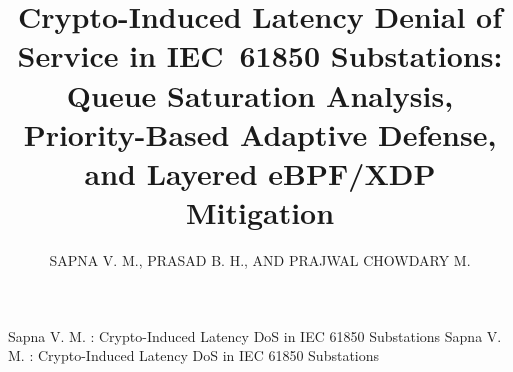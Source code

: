 \documentclass{ieeeaccess}
\begin{document}

\title{Crypto-Induced Latency Denial of Service in IEC~61850 Substations: Queue Saturation Analysis, Priority-Based Adaptive Defense, and Layered eBPF/XDP Mitigation}

\author{\uppercase{Sapna V. M.},
\uppercase{Prasad B. H.}, AND
\uppercase{Prajwal Chowdary M.}}

\address[1]{Department of Computer Science and Engineering, PES University, Bengaluru, Karnataka 560085, India (e-mail: sapnavm@pes.edu)}


\markboth
{Sapna V. M. \headeretal: Crypto-Induced Latency DoS in IEC 61850 Substations}
{Sapna V. M. \headeretal: Crypto-Induced Latency DoS in IEC 61850 Substations}


\maketitle
\end{document}
